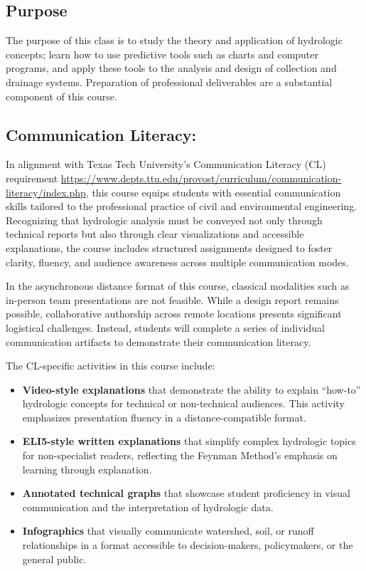 \documentclass[12pt]{article}
\begin{document}
\subsection*{{Purpose}}
The purpose of this class is to study the theory and application of hydrologic concepts; learn how to use predictive tools such as charts and computer programs, and apply these tools to the analysis and design of collection and drainage systems.  Preparation of professional deliverables are a substantial component of this course.

\subsection*{Communication Literacy:}
In alignment with Texas Tech University's Communication Literacy (CL) requirement\newline
\url{https://www.depts.ttu.edu/provost/curriculum/communication-literacy/index.php},\newline
this course equips students with essential communication skills tailored to the professional practice of civil and environmental engineering. Recognizing that hydrologic analysis must be conveyed not only through technical reports but also through clear visualizations and accessible explanations, the course includes structured assignments designed to foster clarity, fluency, and audience awareness across multiple communication modes.

In the asynchronous distance format of this course, classical modalities such as in-person team presentations are not feasible. While a design report remains possible, collaborative authorship across remote locations presents significant logistical challenges. Instead, students will complete a series of individual communication artifacts to demonstrate their communication literacy.


The CL-specific activities in this course include:

\begin{itemize}
\item \textbf{Video-style explanations} that demonstrate the ability to explain “how-to” hydrologic concepts for technical or non-technical audiences. This activity emphasizes presentation fluency in a distance-compatible format.
\item \textbf{ELI5-style written explanations} that simplify complex hydrologic topics for non-specialist readers, reflecting the Feynman Method’s emphasis on learning through explanation.
\item \textbf{Annotated technical graphs} that showcase student proficiency in visual communication and the interpretation of hydrologic data.
\item \textbf{Infographics} that visually communicate watershed, soil, or runoff relationships in a format accessible to decision-makers, policymakers, or the general public.
\end{itemize}
\end{document}
